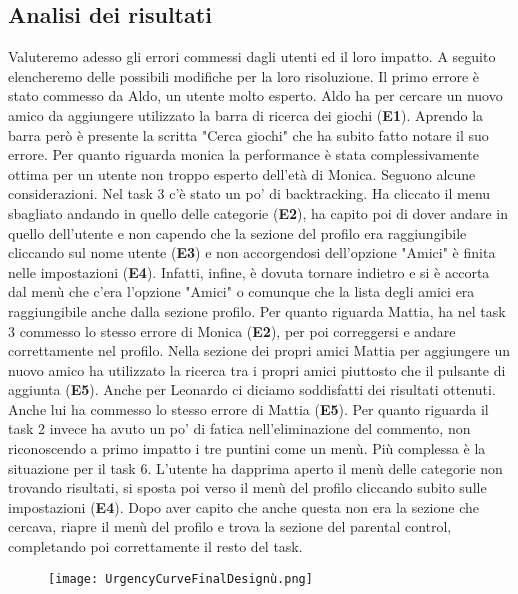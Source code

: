 \documentclass[../Report.tex]{subfiles}
\begin{document}
    \subsection{Analisi dei risultati}
    Valuteremo adesso gli errori commessi dagli utenti ed il loro impatto. A seguito elencheremo delle possibili modifiche per la loro risoluzione. 
    Il primo errore è stato commesso da Aldo, un utente molto esperto.
    Aldo ha per cercare un nuovo amico da aggiungere utilizzato la barra di ricerca dei giochi (\textbf{E1}). Aprendo la barra però è presente la scritta "Cerca giochi" che ha subito fatto notare il suo errore. 
    Per quanto riguarda monica la  performance è stata complessivamente ottima per un utente non troppo esperto dell'età di Monica. Seguono alcune considerazioni. Nel task 3 c'è stato un po' di backtracking. Ha cliccato il menu sbagliato andando in quello delle categorie (\textbf{E2}), ha capito poi di dover andare in quello dell'utente e non capendo che la sezione del profilo era raggiungibile cliccando sul nome utente (\textbf{E3}) e non accorgendosi dell'opzione "Amici" è finita nelle impostazioni (\textbf{E4}). Infatti, infine, è dovuta tornare indietro e si è accorta dal menù che c'era l'opzione "Amici" o comunque che la lista degli amici era raggiungibile anche dalla sezione profilo. 
    Per quanto riguarda Mattia, ha nel task 3 commesso lo stesso errore di Monica (\textbf{E2}), per poi correggersi e andare correttamente nel profilo. Nella sezione dei propri amici Mattia per aggiungere un nuovo amico ha utilizzato la ricerca tra i propri amici piuttosto che il pulsante di aggiunta (\textbf{E5}). Anche per Leonardo ci diciamo soddisfatti dei risultati ottenuti. Anche lui ha commesso lo stesso errore di Mattia (\textbf{E5}). Per quanto riguarda il task 2 invece ha avuto un po' di fatica nell'eliminazione del commento, non riconoscendo a primo impatto i tre puntini come un menù. Più complessa è la situazione per il task 6. L'utente ha dapprima aperto il menù delle categorie non trovando risultati, si sposta poi verso il menù del profilo cliccando subito sulle impostazioni (\textbf{E4}). Dopo aver capito che anche questa non era la sezione che cercava, riapre il menù del profilo e trova la sezione del parental control, completando poi correttamente il resto del task.\\
    \begin{figure}[H]
        \texttt{[image: UrgencyCurveFinalDesignù.png]}
        \centering
    \end{figure}{}
\end{document}
